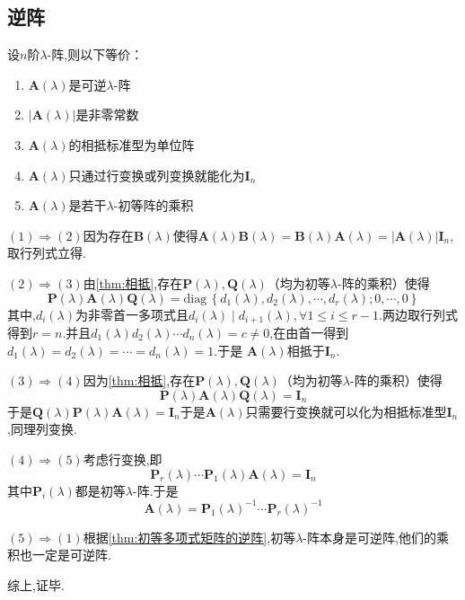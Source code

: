 \subsection{逆阵}
\begin{formal}
\begin{theorem}[可逆的充要条件]\label{thm:可逆的充要条件}
    设$n$阶$\lambda$-阵,则以下等价：
    \begin{enumerate}[label={\textup{(\arabic*)}}]
        \item $\bm{A}\left(\lambda\right)$是可逆$\lambda$-阵
        \item $\left|\bm{A}\left(\lambda\right)\right|$是非零常数
        \item $\bm{A}\left(\lambda\right)$的相抵标准型为单位阵
        \item $\bm{A}\left(\lambda\right)$只通过行变换或列变换就能化为$\bm{I}_n$
        \item $\bm{A}\left(\lambda\right)$是若干$\lambda$-初等阵的乘积
    \end{enumerate}
\end{theorem}
\begin{Proof}
$(1)\Longrightarrow (2)$因为存在$\bm{B}\left(\lambda\right)$使得$\bm{A}\left(\lambda\right)\bm{B}\left(\lambda\right)=\bm{B}\left(\lambda\right)\bm{A}\left(\lambda\right)=\left|\bm{A}\left(\lambda\right)\right|\bm{I}_n$,取行列式立得.

$(2)\Longrightarrow (3)$由\cref{thm:相抵},存在$\bm{P}\left(\lambda\right),\bm{Q}\left(\lambda\right)$（均为初等$\lambda$-阵的乘积）使得
\[
\bm{P}\left(\lambda\right)\bm{A}\left(\lambda\right)\bm{Q}\left(\lambda\right)
=
\mathrm{diag}\,\left\{
    d_1\left(\lambda\right),d_2\left(\lambda\right),\cdots,d_r\left(\lambda\right);0,\cdots,0
\right\}
\]
其中,$d_i\left(\lambda\right)$为非零首一多项式且$d_i\left(\lambda\right)\mid d_{i+1}\left(\lambda\right),\forall 1\leqslant i\leqslant r-1.$两边取行列式得到$r=n$.并且$d_1\left(\lambda\right)d_2\left(\lambda\right)\cdots d_n\left(\lambda\right)=c\neq 0$,在由首一得到$d_1\left(\lambda\right)=d_2\left(\lambda\right)=\cdots=d_n\left(\lambda\right)=1.$于是
$\bm{A}\left(\lambda\right)$相抵于$\bm{I}_n.$

$(3)\Longrightarrow (4)$因为\cref{thm:相抵},存在$\bm{P}\left(\lambda\right),\bm{Q}\left(\lambda\right)$（均为初等$\lambda$-阵的乘积）使得
\[
\bm{P}\left(\lambda\right)\bm{A}\left(\lambda\right)\bm{Q}\left(\lambda\right)
=\bm{I}_n
\]于是$\bm{Q}\left(\lambda\right)\bm{P}\left(\lambda\right)\bm{A}\left(\lambda\right)=\bm{I}_n$于是$\bm{A}\left(\lambda\right)$只需要行变换就可以化为相抵标准型$\bm{I}_n$,同理列变换.

$(4)\Longrightarrow (5)$考虑行变换,即
\[
\bm{P}_r\left(\lambda\right)
\cdots\bm{P}_1\left(\lambda\right)\bm{A}\left(\lambda\right)=\bm{I}_n
\]
其中$\bm{P}_i\left(\lambda\right)$都是初等$\lambda$-阵.于是
\[
\bm{A}\left(\lambda\right)=
\bm{P}_1\left(\lambda\right)^{-1}
\cdots\bm{P}_r\left(\lambda\right)^{-1}
\]

$(5)\Longrightarrow (1)$根据\cref{thm:初等多项式矩阵的逆阵},初等$\lambda$-阵本身是可逆阵,他们的乘积也一定是可逆阵.

综上,证毕.
\end{Proof}
\end{formal}
